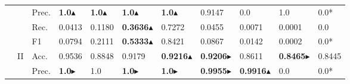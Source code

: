 \begin{tabular}{cclllllllll}
                                                                                           &                                   & Prec.                                                & \textbf{1.0}$\blacktriangle$           & \textbf{1.0}$\blacktriangle$           & \textbf{1.0}$\blacktriangle$                & \textbf{1.0}$\blacktriangle$           & 0.9147                                                                       & 0.0                                                                         & 1.0                                       & 0.0*                                      \\
                                                                                           &                                   & Rec.                                                 & 0.0413                  & 0.1180                  & \textbf{0.3636}$\blacktriangle$             & 0.7272                  & 0.0455                                                                       & 0.0071                                                                      & 0.0001                                    & 0.0                                       \\
                                                                                           &                                   & F1                                                   & 0.0794                  & 0.2111                  & \textbf{0.5333}$\blacktriangle$             & 0.8421                  & 0.0867                                                                       & 0.0142                                                                      & 0.0002                                    & 0.0*                                      \\ 
    \cmidrule{2-11}
                                                                                           & \multirow{4}{*}{II}               & Acc.                                                 & 0.9536                  & 0.8848                  & 0.9179                       & \textbf{0.9216$\blacktriangle$}        & \textbf{0.9206}$\blacktriangleright$                                                              & 0.8611                                                                      & \textbf{0.8465}$\blacktriangleright$                          & 0.8445                                    \\
                                                                                           &                                   & Prec.                                                & \textbf{1.0}$\blacktriangleright$            & 1.0                     & \textbf{1.0}$\blacktriangleright$                 & \textbf{1.0}$\blacktriangleright$            & \textbf{0.9955}$\blacktriangleright$                                                              & \textbf{0.9916}$\blacktriangle$                                                            & 0.0                                       & 0.0*                                      \\

\end{tabular}
